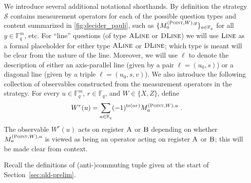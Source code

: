 \documentclass[11pt]{article}
\theoremstyle{definition}
\newcommand{\F}{\ensuremath{\mathbb{F}}}
\DeclareMathOperator{\tr}{tr}
\newcommand{\strategy}{\mathscr{S}}
\newcommand{\labelstyle}[1]{\ensuremath{\textsc{#1}}\xspace}
\newcommand{\alice}{\labelstyle{A}}
\newcommand{\bob}{\labelstyle{B}}
\newcommand{\typestyle}[1]{\ensuremath{\textsc{#1}}\xspace}
\newcommand{\Point}{\typestyle{Point}}
\newcommand{\Line}{\typestyle{Line}}
\newcommand{\ALine}{\typestyle{ALine}}
\newcommand{\DLine}{\typestyle{DLine}}
\begin{document}
We introduce several additional notational shorthands. By definition the strategy $\strategy$ contains measurement
  operators for each of the possible question types and content
  summarized in \cref{fig:decider_pauli}, such as $\{M^{(\Point,
    W),y}_a\}_{a\in\F_q}$ for all $y\in\F_q^m$, etc. 
For ``line'' questions (of type $\ALine$ or $\DLine$) we will use
 $\Line$ as a formal placeholder for either type $\ALine$ or $\DLine$;
  which type is meant will be clear from the nature of the
  line. Moreover, we will use $\ell$ to denote the description of
  either an axis-parallel line (given by a pair $\ell=(u_0, s)$) or a
  diagonal line (given by a triple $\ell=(u_0, s, v)$). We also introduce the following collection of observables constructed from the
  measurement operators in the strategy. 	
	For every $u \in
  \F_q^m$, $r \in \F_q$, and $W \in \{X, Z\}$, define
  \begin{equation}
    W^r(u) =\sum_{a\in\F_q} (-1)^{\tr(ar)}  M^{(\Point, W), u}_a\;. \label{eq:qld-strat-obs}
  \end{equation}
	The observable $W^r(u)$ acts on register $\alice$ or $\bob$ depending on whether $M^{(\Point, W), u}_a$ is viewed as being an operator acting on register $\alice$ or $\bob$; this will be made clear from context.
	



Recall the definitions of (anti-)commuting tuple given at the start of Section~\ref{sec:qld-prelim}. 
\end{document}
